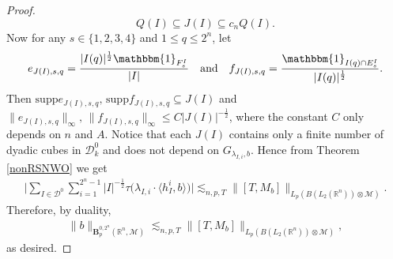 \documentclass[oneside,english,a4wide]{amsart}
\numberwithin{equation}{section}
\numberwithin{figure}{section}
\theoremstyle{plain}
\theoremstyle{plain}
\newtheorem{corollary}[thm]{Corollary}
\theoremstyle{definition}
\theoremstyle{plain}
\theoremstyle{remark}
\theoremstyle{definition}
\theoremstyle{remark}
\theoremstyle{definition}
\newcommand{\8}{\infty}
\begin{document}
\begin{proof}
\begin{equation*}
			Q(I)\subseteq J(I)\subseteq c_n Q(I).
		\end{equation*}
		Now for any $s\in\{1,2,3,4\}$ and $1\le q\le 2^n$, let
		\begin{equation*}
			e_{J(I),s,q}=\frac{|I(q)|^{\frac{1}{2}}\mathbbm{1}_{F_s^I}}{|I|} \quad \text{and} \quad f_{J(I),s,q}=\frac{\mathbbm{1}_{I(q)\cap E_s^I}}{|I(q)|^{\frac{1}{2}}}.
		\end{equation*}
		Then  $\mathrm{supp}e_{J(I),s,q},\,\mathrm{supp}f_{J(I),s,q}\subseteq J(I)$ and $\|e_{J(I),s,q}\|_{\infty},\,\|f_{J(I),s,q}\|_{\infty}\le C|J(I)|^{-\frac{1}{2}}$, where 
		the constant $C$ only depends on $n$ and $A$. Notice that each $J(I)$ contains only a finite number of dyadic cubes in $\mathcal{D}_k^0$ and does not depend on $G_{\lambda_{I,i},b}$. Hence from Theorem \ref{nonRSNWO} we get
	\begin{equation*}
		\begin{aligned}
			\bigg|\sum_{I\in\mathcal{D}^0}\sum_{i=1}^{2^n-1} |I|^{-\frac{1}{2}}\tau\big(\lambda_{I,i}\cdot\langle h_I^i,b\rangle \big)\bigg|
			\lesssim_{n,p,T} \|[T,M_b]\|_{L_p(B(L_2(\mathbb{R}^n))\otimes \mathcal{M})}.
		\end{aligned}
	\end{equation*}
    Therefore, by duality,
	\begin{equation*}
		\begin{aligned}
			\|b\|_{\pmb{B}_p^{0,2^n}(\mathbb{R}^n,\mathcal{M})}\lesssim_{n,p,T}\|[T,M_b]\|_{L_p(B(L_2(\mathbb{R}^n))\otimes \mathcal{M})},
		\end{aligned}
	\end{equation*}
	as desired.
\end{proof}

\end{document}
